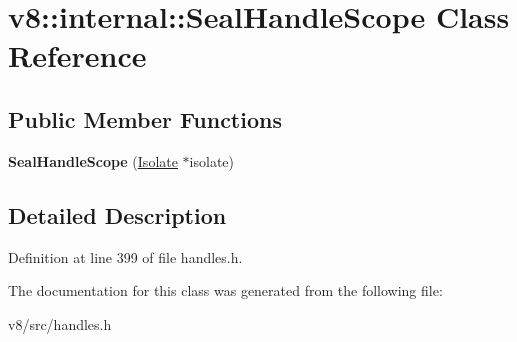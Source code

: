 \hypertarget{classv8_1_1internal_1_1SealHandleScope}{}\section{v8\+:\+:internal\+:\+:Seal\+Handle\+Scope Class Reference}
\label{classv8_1_1internal_1_1SealHandleScope}
\subsection*{Public Member Functions}
\begin{DoxyCompactItemize}
\item 
\mbox{\label{classv8_1_1internal_1_1SealHandleScope_a0da7b60b2fb11fee0ff7c36942537ac6}} 
{\bfseries Seal\+Handle\+Scope} (\mbox{\hyperlink{classv8_1_1internal_1_1Isolate}{Isolate}} $\ast$isolate)
\end{DoxyCompactItemize}


\subsection{Detailed Description}


Definition at line 399 of file handles.\+h.



The documentation for this class was generated from the following file\+:\begin{DoxyCompactItemize}
\item 
v8/src/handles.\+h\end{DoxyCompactItemize}
